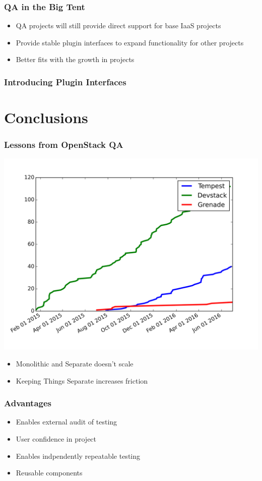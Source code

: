 \documentclass[aspectratio=169,11pt,hyperref={colorlinks=true}]{beamer}
\begin{document}
\begin{frame}
    \frametitle{QA in the Big Tent}
    \begin{itemize}
        \item QA projects will still provide direct support for base IaaS projects
        \item Provide stable plugin interfaces to expand functionality for other projects
        \item Better fits with the growth in projects
    \end{itemize}
\end{frame}

\begin{frame}
    \frametitle{Introducing Plugin Interfaces}    
\end{frame}

\section{Conclusions}

\begin{frame}
    \frametitle{Lessons from OpenStack QA}
    \begin{center}
        \includegraphics[width=.6\textwidth]{plugins.png}
    \end{center}
    \begin{itemize}
        \item Monolithic and Separate doesn't scale
        \item Keeping Things Separate increases friction
    \end{itemize}
\end{frame}

\begin{frame}
    \frametitle{Advantages}
    \begin{itemize}
        \item Enables external audit of testing
        \item User confidence in project
        \item Enables indpendently repeatable testing
        \item Reusable components
    \end{itemize}
\end{frame}
\end{document}
